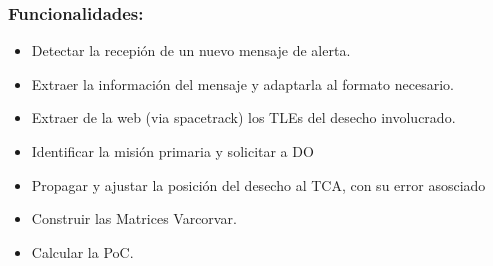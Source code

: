 \subsubsection*{Funcionalidades:}
\begin{itemize}
\item Detectar la recepi\'on de un nuevo mensaje de alerta.\\
\item Extraer la informaci\'on del mensaje y adaptarla al formato necesario.\\
\item Extraer de la web (via spacetrack) los TLEs del desecho involucrado.\\
\item Identificar la misi\'on primaria y solicitar a DO {\color{red}{los datos orbitales precisos necesarios: posici\'on $+$ error}}\\
\item Propagar y ajustar la posici\'on del desecho al TCA, con su error asosciado\\
\item Construir las Matrices Varcorvar.\\
\item Calcular la PoC.\\ 
\end{itemize}


\label{sec:arqydis}
